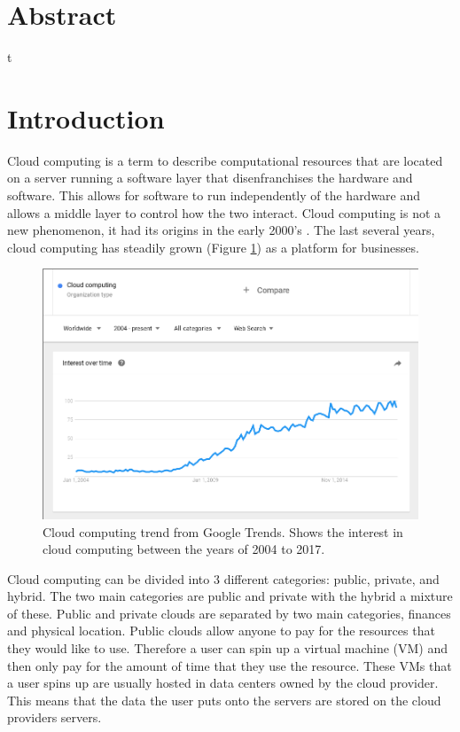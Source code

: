 \documentclass[12pt]{article}
\begin{document}

\newpage
\tableofcontents
\newpage

\section{Abstract}
t

\section{Introduction}
Cloud computing is a term to describe computational resources that are located on a server running a software layer that disenfranchises the hardware and software. This allows for software to run independently of the hardware and allows a middle layer to control how the two interact. Cloud computing is not a new phenomenon\cite{rochwerger2009reservoir}, it had its origins in the early 2000's \cite{rochwerger2009reservoir}. The last several years, cloud computing has steadily grown (Figure \ref{fig:CloudTrendGoogle}) as a platform for businesses.

\begin{figure}[ht]
    \centering
    \includegraphics[scale=.3]{./pic/2017-06-14-130823_923x615_scrot.png}
    \caption{Cloud computing trend from Google Trends. Shows the interest in cloud computing between the years of 2004 to 2017. \cite{GoogleTrendsCloud}}
    \label{fig:CloudTrendGoogle}
\end{figure}

Cloud computing can be divided into 3 different categories: public, private, and hybrid.  The two main categories are public and private with the hybrid a mixture of these. Public and private clouds are separated by two main categories, finances and physical location. Public clouds allow anyone to pay for the resources that they would like to use. Therefore a user can spin up a virtual machine (VM) and then only pay for the amount of time that they use the resource. These VMs that a user spins up are usually hosted in data centers owned by the cloud provider. This means that the data the user puts onto the servers are stored on the cloud providers servers.
\end{document}
